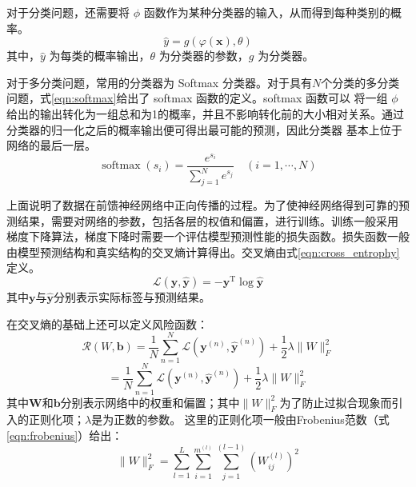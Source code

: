 对于分类问题，还需要将 $\phi$ 函数作为某种分类器的输入，从而得到每种类别的概率。
\begin{equation} 
\hat{y}=g(\varphi(\mathbf{x}), \theta)
\end{equation}
其中，$\hat{y}$ 为每类的概率输出，$\theta$ 为分类器的参数，$g$ 为分类器。

对于多分类问题，常用的分类器为 Softmax 分类器。对于具有$N$个分类的多分类问题，式\ref{eqn:softmax}给出了 softmax 函数的定义。softmax 函数可以
将一组 $\phi$ 给出的输出转化为一组总和为1的概率，并且不影响转化前的大小相对关系。通过分类器的归一化之后的概率输出便可得出最可能的预测，因此分类器
基本上位于网络的最后一层。
\begin{equation} 
\label{eqn:softmax}
\operatorname{softmax}\left(s_{i}\right)=\frac{e^{s_{i}}}{\sum_{j=1}^{N} e^{s_{j}}} \quad(i=1, \cdots, N)
\end{equation}

上面说明了数据在前馈神经网络中正向传播的过程。为了使神经网络得到可靠的预测结果，需要对网络的参数，包括各层的权值和偏置，进行训练。训练一般采用
梯度下降算法，梯度下降时需要一个评估模型预测性能的损失函数。损失函数一般由模型预测结构和真实结构的交叉熵计算得出。交叉熵由式\ref{eqn:cross_entrophy}定义。
\begin{equation}
\label{eqn:cross_entrophy} 
\mathcal{L}(\mathbf{y}, \hat{\mathbf{y}})=-\mathbf{y}^{\mathrm{T}} \log \hat{\mathbf{y}}
 \end{equation}
其中$\mathbf{y}$与$\hat{\mathbf{y}}$分别表示实际标签与预测结果。

在交叉熵的基础上还可以定义风险函数：
\begin{equation} 
\mathcal{R}(W, \mathbf{b})=\frac{1}{N} \sum_{n=1}^{N} \mathcal{L}\left(\mathbf{y}^{(n)}, \hat{\mathbf{y}}^{(n)}\right)+\frac{1}{2} \lambda\|W\|_{F}^{2}
\end{equation}
\begin{equation} 
=\frac{1}{N} \sum_{n=1}^{N} \mathcal{L}\left(\mathbf{y}^{(n)}, \hat{\mathbf{y}}^{(n)}\right)+\frac{1}{2} \lambda\|W\|_{F}^{2}
\end{equation}
其中$\mathbf{W}$和$\mathbf{b}$分别表示网络中的权重和偏置；其中$\|W\|_{F}^{2}$为了防止过拟合现象而引入的正则化项；$\lambda$是为正数的参数。
这里的正则化项一般由Frobenius范数（式\ref{eqn:frobenius}）给出：
\begin{equation} 
\label{eqn:frobenius}
\|W\|_{F}^{2}=\sum_{l=1}^{L} \sum_{i=1}^{m^{(l)}} \sum_{j=1}^{(l-1)}\left(W_{i j}^{(l)}\right)^{2}
\end{equation}

